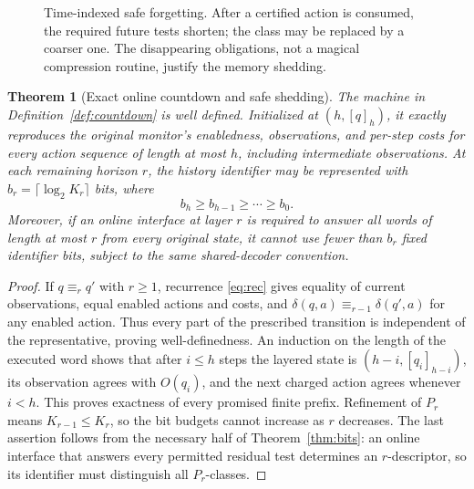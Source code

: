 \documentclass[11pt,letterpaper]{article}
\newtheorem{theorem}{Theorem}[section]
\newcommand{\eqk}[1]{\equiv_{#1}}
\begin{document}
\begin{figure}[htbp]\centering
{}
\caption{Time-indexed safe forgetting. After a certified action is consumed, the required future tests shorten; the class may be replaced by a coarser one. The disappearing obligations, not a magical compression routine, justify the memory shedding.}\label{fig:countdown}
\end{figure}

\begin{theorem}[Exact online countdown and safe shedding]\label{thm:countdown}
The machine in Definition~\ref{def:countdown} is well defined. Initialized at $(h,[q]_h)$, it exactly reproduces the original monitor's enabledness, observations, and per-step costs for every action sequence of length at most $h$, including intermediate observations. At each remaining horizon $r$, the history identifier may be represented with $b_r=\lceil\log_2 K_r\rceil$ bits, where
\[
 b_h\ge b_{h-1}\ge\cdots\ge b_0.
\]
Moreover, if an online interface at layer $r$ is required to answer \emph{all} words of length at most $r$ from every original state, it cannot use fewer than $b_r$ fixed identifier bits, subject to the same shared-decoder convention.
\end{theorem}
\begin{proof}
If $q\eqk{r}q'$ with $r\ge1$, recurrence \eqref{eq:rec} gives equality of current observations, equal enabled actions and costs, and $\delta(q,a)\eqk{r-1}\delta(q',a)$ for any enabled action. Thus every part of the prescribed transition is independent of the representative, proving well-definedness. An induction on the length of the executed word shows that after $i\le h$ steps the layered state is $(h-i,[q_i]_{h-i})$, its observation agrees with $O(q_i)$, and the next charged action agrees whenever $i<h$. This proves exactness of every promised finite prefix. Refinement of $P_r$ means $K_{r-1}\le K_r$, so the bit budgets cannot increase as $r$ decreases. The last assertion follows from the necessary half of Theorem~\ref{thm:bits}: an online interface that answers every permitted residual test determines an $r$-descriptor, so its identifier must distinguish all $P_r$-classes.
\end{proof}
\end{document}
